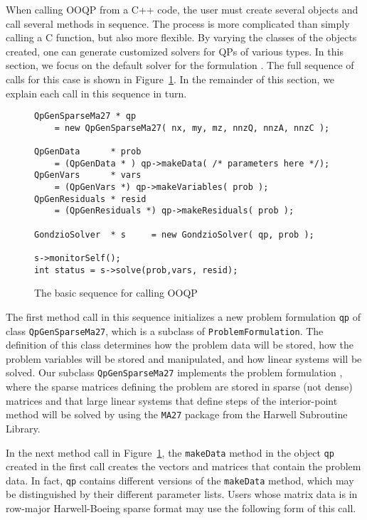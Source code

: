 When calling OOQP from a C++ code, the user must create several objects
and call several methods in sequence.  The process is more complicated
than simply calling a C function, but also more flexible. By varying
the classes of the objects created, one can generate customized
solvers for QPs of various types. In this section, we focus on
the default solver for the formulation . The full
sequence of calls for this case is shown in Figure~\ref{calling}. In
the remainder of this section, we explain each call in this sequence
in turn.

\begin{figure}[htb]
\begin{verbatim}
QpGenSparseMa27 * qp 
    = new QpGenSparseMa27( nx, my, mz, nnzQ, nnzA, nnzC );

QpGenData      * prob 
    = (QpGenData * ) qp->makeData( /* parameters here */);
QpGenVars      * vars 
    = (QpGenVars *) qp->makeVariables( prob );
QpGenResiduals * resid 
    = (QpGenResiduals *) qp->makeResiduals( prob );

GondzioSolver  * s     = new GondzioSolver( qp, prob );

s->monitorSelf();
int status = s->solve(prob,vars, resid);
\end{verbatim}
\caption{The basic sequence for calling OOQP \label{calling}}
\end{figure}

The first method call in this sequence 
initializes a new problem formulation \texttt{qp} of class
\texttt{QpGenSparseMa27}, which is a subclass of
\texttt{ProblemFormulation}.  The definition of this class determines
how the problem data will be stored, how the problem variables will be
stored and manipulated, and how linear systems will be solved. Our
subclass \texttt{QpGenSparseMa27} implements the problem formulation
, where the sparse matrices defining the problem are
stored in sparse (not dense) matrices and that large linear systems
that define steps of the interior-point method will be solved by using
the \texttt{MA27} package from the Harwell Subroutine Library.

In the next method call in Figure~\ref{calling},
the \texttt{makeData} method in the object \texttt{qp} created
in the first call creates the vectors and matrices that contain the
problem data. In fact, \texttt{qp} contains different versions of the
\texttt{makeData} method, which may be distinguished by their
different parameter lists. Users whose matrix data is in row-major
Harwell-Boeing sparse format may use the following form of this call.

